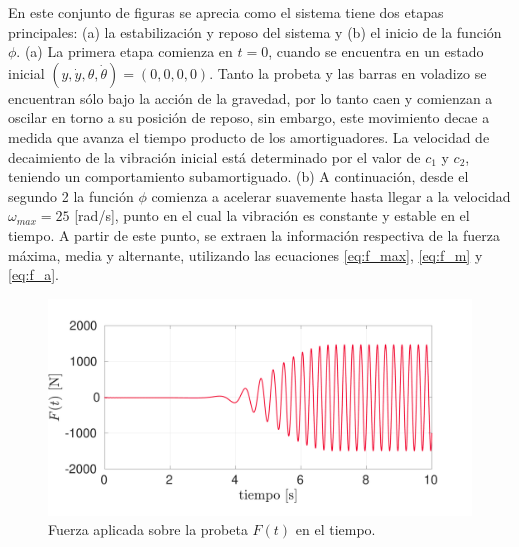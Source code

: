 En este conjunto de figuras se aprecia como el sistema tiene dos etapas principales: (a) la estabilización y reposo del sistema y (b) el inicio de la función $\phi$. (a) La primera etapa comienza en $t=0$, cuando se encuentra en un estado inicial $(y, \dot{y}, \theta, \dot{\theta}) = (0,0,0,0)$. Tanto la probeta y las barras en voladizo se encuentran sólo bajo la acción de la gravedad, por lo tanto caen y comienzan a oscilar en torno a su posición de reposo, sin embargo, este movimiento decae a medida que avanza el tiempo producto de los amortiguadores. La velocidad de decaimiento de la vibración inicial está determinado por el valor de $c_1$ y $c_2$, teniendo un comportamiento subamortiguado. (b) A continuación, desde el segundo 2 la función $\phi$ comienza a acelerar suavemente hasta llegar a la velocidad $\omega_{max} = 25$ [rad/s], punto en el cual la vibración es constante y estable en el tiempo. A partir de este punto, se extraen la información respectiva de la fuerza máxima, media y alternante, utilizando las ecuaciones \ref{eq:f_max}, \ref{eq:f_m} y \ref{eq:f_a}. 

\begin{figure}[h]
\centering
\includegraphics[width=0.95\linewidth, trim={0cm 1cm 2cm 1cm},clip]{Imagenes/f_2.pdf}
\caption{Fuerza aplicada sobre la probeta $F(t)$ en el tiempo.}
\label{fig:f_2}
\end{figure}


